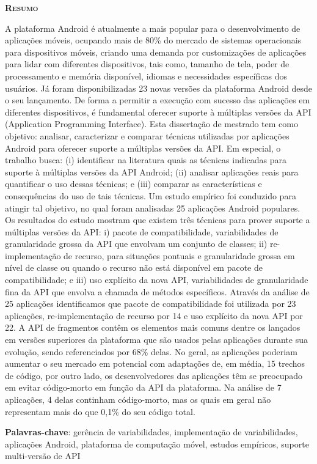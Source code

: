 
\begin{center}
	\Large{\textsc{\textbf{Resumo}}}
\end{center}

\noindent A plataforma Android é atualmente a mais popular para o desenvolvimento
de aplicações móveis, ocupando mais de 80\% do mercado de sistemas operacionais para
dispositivos móveis, criando uma demanda por customizações de aplicações para lidar
com diferentes dispositivos, tais como, tamanho de tela, poder de processamento e
memória disponível, idiomas e necessidades específicas dos usuários. Já foram
disponibilizadas 23 novas versões da plataforma Android desde o seu lançamento. De
forma a permitir a execução com sucesso das aplicações em diferentes dispositivos,
é fundamental oferecer suporte à múltiplas versões da API (Application Programming
Interface). Esta dissertação de mestrado tem como objetivo: analisar,
caracterizar e comparar técnicas utilizadas por aplicações Android para oferecer
suporte a múltiplas versões da API. Em especial, o trabalho busca: (i) identificar
na literatura quais as técnicas indicadas para suporte à múltiplas versões da API
Android; (ii) analisar aplicações reais para quantificar o uso dessas técnicas; e
(iii) comparar as características e consequências do uso de tais
técnicas. Um estudo empírico foi conduzido para atingir tal objetivo, no qual
foram analisadas 25 aplicações Android populares. Os resultados do estudo mostram
que existem três técnicas para prover suporte a múltiplas versões da API: i) pacote
de compatibilidade, variabilidades de granularidade grossa da API que envolvam um
conjunto de classes; ii) re-implementação de recurso, para situações pontuais e
granularidade grossa em nível de classe ou quando o recurso não está disponível
em pacote de compatibilidade; e iii) uso explícito da nova API, variabilidades de
granularidade fina da API que envolva a chamada de métodos específicos. Através da
análise de 25 aplicações identificamos que pacote de compatibilidade foi utilizada
por 23 aplicações, re-implementação de recurso por 14 e uso explícito da nova API
por 22. A API de fragmentos contêm os elementos mais comuns dentre os lançados em
versões superiores da plataforma que são usados pelas aplicações durante sua evolução,
sendo referenciados por 68\% delas. No geral, as aplicações poderiam aumentar o seu
mercado em potencial com adaptações de, em média, 15 trechos de código, por outro
lado, os desenvolvedores das aplicações têm se preocupado em evitar código-morto em
função da API da plataforma. Na análise de 7 aplicações, 4 delas continham código-morto,
mas os quais em geral não representam mais do que 0,1\% do seu código total.

\noindent\textbf{Palavras-chave}: gerência de variabilidades, implementação de
variabilidades, aplicações Android, plataforma de computação móvel, estudos empíricos,
suporte multi-versão de API